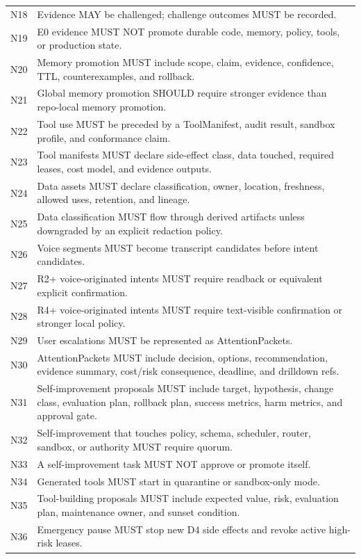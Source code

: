 \documentclass[journal,onecolumn]{IEEEtran}
\begin{document}
\begin{longtable}{p{}p{}}
N18 & Evidence MAY be challenged; challenge outcomes MUST be recorded.\\
N19 & E0 evidence MUST NOT promote durable code, memory, policy, tools, or production state.\\
N20 & Memory promotion MUST include scope, claim, evidence, confidence, TTL, counterexamples, and rollback.\\
N21 & Global memory promotion SHOULD require stronger evidence than repo-local memory promotion.\\
N22 & Tool use MUST be preceded by a ToolManifest, audit result, sandbox profile, and conformance claim.\\
N23 & Tool manifests MUST declare side-effect class, data touched, required leases, cost model, and evidence outputs.\\
N24 & Data assets MUST declare classification, owner, location, freshness, allowed uses, retention, and lineage.\\
N25 & Data classification MUST flow through derived artifacts unless downgraded by an explicit redaction policy.\\
N26 & Voice segments MUST become transcript candidates before intent candidates.\\
N27 & R2+ voice-originated intents MUST require readback or equivalent explicit confirmation.\\
N28 & R4+ voice-originated intents MUST require text-visible confirmation or stronger local policy.\\
N29 & User escalations MUST be represented as AttentionPackets.\\
N30 & AttentionPackets MUST include decision, options, recommendation, evidence summary, cost/risk consequence, deadline, and drilldown refs.\\
N31 & Self-improvement proposals MUST include target, hypothesis, change class, evaluation plan, rollback plan, success metrics, harm metrics, and approval gate.\\
N32 & Self-improvement that touches policy, schema, scheduler, router, sandbox, or authority MUST require quorum.\\
N33 & A self-improvement task MUST NOT approve or promote itself.\\
N34 & Generated tools MUST start in quarantine or sandbox-only mode.\\
N35 & Tool-building proposals MUST include expected value, risk, evaluation plan, maintenance owner, and sunset condition.\\
N36 & Emergency pause MUST stop new D4 side effects and revoke active high-risk leases.\\

\end{longtable}
\end{document}
